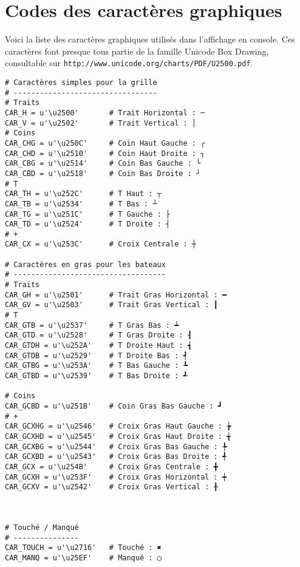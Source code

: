 \chapter{Codes des caractères graphiques}
{\normalsize
Voici la liste des caractères graphiques utilisés dans l'affichage en console. Ces caractères font presque tous partie de la famille Unicode Box Drawing, consultable sur \texttt{http://www.unicode.org/charts/PDF/U2500.pdf}.}

\begin{verbatim}
# Caractères simples pour la grille
# ---------------------------------
# Traits
CAR_H = u'\u2500'		# Trait Horizontal : ─
CAR_V = u'\u2502'		# Trait Vertical : │
# Coins
CAR_CHG = u'\u250C'		# Coin Haut Gauche : ┌
CAR_CHD = u'\u2510'		# Coin Haut Droite : ┐
CAR_CBG = u'\u2514'		# Coin Bas Gauche : └
CAR_CBD = u'\u2518'		# Coin Bas Droite : ┘
# T
CAR_TH = u'\u252C'		# T Haut : ┬
CAR_TB = u'\u2534'		# T Bas : ┴
CAR_TG = u'\u251C'		# T Gauche : ├
CAR_TD = u'\u2524'		# T Droite : ┤
# +
CAR_CX = u'\u253C'		# Croix Centrale : ┼

# Caractères en gras pour les bateaux
# -----------------------------------
# Traits
CAR_GH = u'\u2501'		# Trait Gras Horizontal : ━
CAR_GV = u'\u2503'		# Trait Gras Vertical : ┃
# T
CAR_GTB = u'\u2537'		# T Gras Bas : ┷
CAR_GTD = u'\u2528'		# T Gras Droite : ┨
CAR_GTDH = u'\u252A'	# T Droite Haut : ┪
CAR_GTDB = u'\u2529'	# T Droite Bas : ┩
CAR_GTBG = u'\u253A'	# T Bas Gauche : ┺
CAR_GTBD = u'\u2539'	# T Bas Droite : ┹

# Coins
CAR_GCBD = u'\u251B'	# Coin Gras Bas Gauche : ┛
# +
CAR_GCXHG = u'\u2546'	# Croix Gras Haut Gauche : ╆
CAR_GCXHD = u'\u2545'	# Croix Gras Haut Droite : ╅
CAR_GCXBG = u'\u2544'	# Croix Gras Bas Gauche : ╄
CAR_GCXBD = u'\u2543'	# Croix Gras Bas Droite : ╃
CAR_GCX = u'\u254B'		# Croix Gras Centrale : ╋
CAR_GCXH = u'\u253F'	# Croix Gras Horizontal : ┿
CAR_GCXV = u'\u2542'	# Croix Gras Vertical : ╂



# Touché / Manqué
# ---------------
CAR_TOUCH = u'\u2716' 	# Touché : ✖
CAR_MANQ = u'\u25EF' 	# Manqué : ◯
\end{verbatim}
